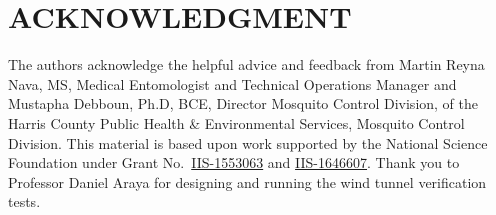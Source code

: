 \section*{ACKNOWLEDGMENT}
The authors acknowledge the helpful advice and feedback from Martin Reyna Nava, MS, Medical Entomologist and Technical Operations Manager and Mustapha Debboun, Ph.D, BCE, Director Mosquito Control Division, of the Harris County Public Health \& Environmental Services, Mosquito Control Division.
This material is based upon work supported by the National Science Foundation under Grant No.\ 
\href{https://nsf.gov/awardsearch/showAward?AWD_ID=1553063}{IIS-1553063} and
\href{https://nsf.gov/awardsearch/showAward?AWD_ID=1646607}{IIS-1646607}.
Thank you to Professor Daniel Araya for designing and running the wind tunnel verification tests.

